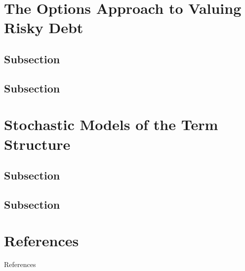 \documentclass[
14pt,notheorems,hyperref={pdfauthor=whatever}
]{beamer}
\begin{document}
\section{The Options Approach to Valuing Risky Debt}
\subsection{Subsection}
\subsection{Subsection}

\section{Stochastic Models of the Term Structure}
\subsection{Subsection}
\subsection{Subsection}

\section*{References}
\begin{frame}[allowframebreaks]{References}
    \printbibliography
\end{frame}
\end{document}
